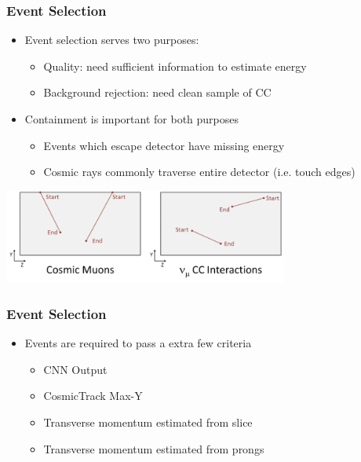 \documentclass[10pt,professionalfonts,xcolor=table]{beamer}
\begin{document}
\begin{frame}
\frametitle{Event Selection}

\begin{itemize}
\item Event selection serves two purposes:
  \begin{itemize}
  \item Quality: need sufficient information to estimate energy
  \item Background rejection: need clean sample of \numu CC
  \end{itemize}
\item Containment is important for both purposes
  \begin{itemize}
  \item Events which escape detector have missing energy
  \item Cosmic rays commonly traverse entire detector (i.e. touch edges)
  \end{itemize}
\end{itemize}
\begin{center}
 \includegraphics[width=0.7\textwidth]{figures/selection/cosmicmuons.png}
\end{center}

\end{frame}

\begin{frame}
\frametitle{Event Selection}


\begin{itemize}
\item Events are required to pass a extra few criteria
\begin{itemize}
\item CNN Output
\item CosmicTrack Max-Y
\item Transverse momentum estimated from slice
\item Transverse momentum estimated from prongs

\end{itemize}
\end{itemize}
\end{frame}
\end{document}
